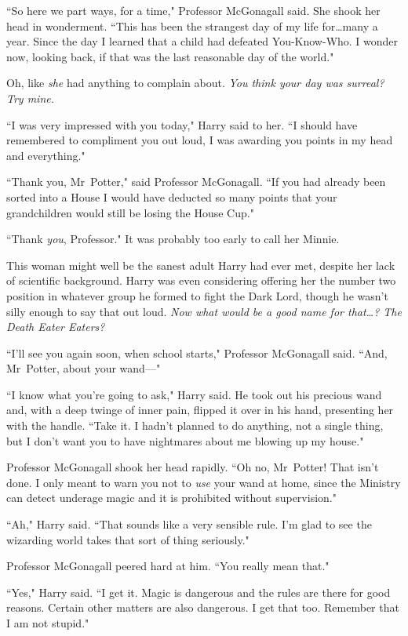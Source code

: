 ``So here we part ways, for a time," Professor McGonagall said. She shook her head in wonderment. ``This has been the strangest day of my life for…many a year. Since the day I learned that a child had defeated You-Know-Who. I wonder now, looking back, if that was the last reasonable day of the world."

Oh, like \emph{she} had anything to complain about. \emph{You think your day was surreal? Try mine.}

``I was very impressed with you today," Harry said to her. ``I should have remembered to compliment you out loud, I was awarding you points in my head and everything."

``Thank you, Mr~Potter," said Professor McGonagall. ``If you had already been sorted into a House I would have deducted so many points that your grandchildren would still be losing the House Cup."

``Thank \emph{you}, Professor." It was probably too early to call her Minnie.

This woman might well be the sanest adult Harry had ever met, despite her lack of scientific background. Harry was even considering offering her the number two position in whatever group he formed to fight the Dark Lord, though he wasn't silly enough to say that out loud. \emph{Now what would be a good name for that…? The Death Eater Eaters?}

``I'll see you again soon, when school starts," Professor McGonagall said. ``And, Mr~Potter, about your wand—"

``I know what you're going to ask," Harry said. He took out his precious wand and, with a deep twinge of inner pain, flipped it over in his hand, presenting her with the handle. ``Take it. I hadn't planned to do anything, not a single thing, but I don't want you to have nightmares about me blowing up my house."

Professor McGonagall shook her head rapidly. ``Oh no, Mr~Potter! That isn't done. I only meant to warn you not to \emph{use} your wand at home, since the Ministry can detect underage magic and it is prohibited without supervision."

``Ah," Harry said. ``That sounds like a very sensible rule. I'm glad to see the wizarding world takes that sort of thing seriously."

Professor McGonagall peered hard at him. ``You really mean that."

``Yes," Harry said. ``I get it. Magic is dangerous and the rules are there for good reasons. Certain other matters are also dangerous. I get that too. Remember that I am not stupid."

